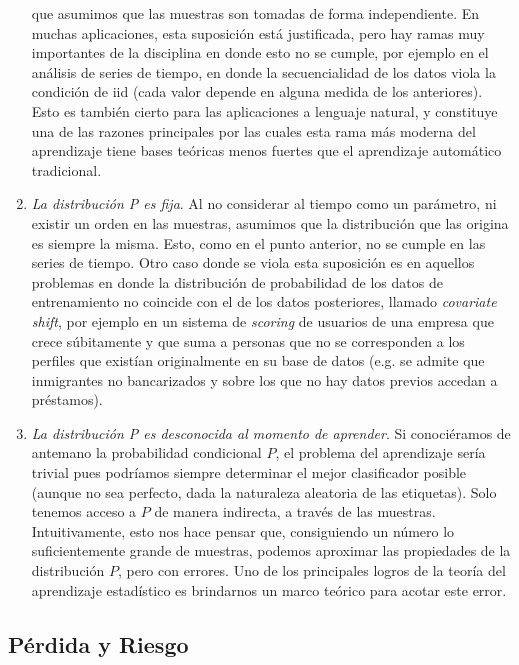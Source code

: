 \documentclass{report}
\begin{document}
\begin{enumerate}
    que asumimos que las muestras son tomadas de forma independiente. En muchas aplicaciones, esta suposición está justificada, pero
    hay ramas muy importantes de la disciplina en donde esto no se cumple, por ejemplo en el análisis de series de tiempo, en donde
    la secuencialidad de los datos viola la condición de iid (cada valor depende en alguna medida de los anteriores). Esto es también 
    cierto para las aplicaciones a lenguaje natural, y constituye una de las razones principales por las cuales esta rama más moderna 
    del aprendizaje tiene bases teóricas menos fuertes que el aprendizaje automático tradicional.
    \item \textit{La distribución P es fija}. Al no considerar al tiempo como un parámetro, ni existir un orden en las muestras, asumimos
    que la distribución que las origina es siempre la misma. Esto, como en el punto anterior, no se cumple en las series de tiempo. Otro
    caso donde se viola esta suposición es en aquellos problemas en donde la distribución de probabilidad de los datos de entrenamiento no
    coincide con el de los datos posteriores, llamado \textit{covariate shift}, por ejemplo en un sistema de \textit{scoring} de usuarios
    de una empresa que crece súbitamente y que suma a personas que no se corresponden a los perfiles que existían originalmente en su base
    de datos (e.g. se admite que inmigrantes no bancarizados y sobre los que no hay datos previos accedan a préstamos).
    \item \textit{La distribución P es desconocida al momento de aprender}. Si conociéramos de antemano la probabilidad condicional $P$,
    el problema del aprendizaje sería trivial pues podríamos siempre determinar el mejor clasificador posible (aunque no sea perfecto,
    dada la naturaleza aleatoria de las etiquetas). Solo tenemos acceso a $P$ de manera indirecta, a través de las muestras. Intuitivamente,
    esto nos hace pensar que, consiguiendo un número lo suficientemente grande de muestras, podemos aproximar las propiedades de la distribución
    $P$, pero con errores. Uno de los principales logros de la teoría del aprendizaje estadístico es brindarnos un marco teórico para
    acotar este error.
\end{enumerate}

\subsection{Pérdida y Riesgo}
\end{document}
